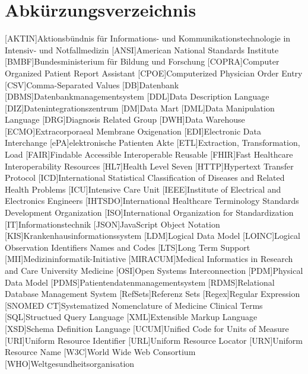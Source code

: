 \chapter*{Abkürzungsverzeichnis}

\begin{acronym}[ABK]
	[AKTIN]{Aktionsbündnis für Informations- und Kommunikationstechnologie in Intensiv- und Notfallmedizin}
	[ANSI]{American National Standards Institute}
	[BMBF]{Bundesministerium für Bildung und Forschung}
	[COPRA]{Computer Organized Patient Report Assistant}
	[CPOE]{Computerized Physician Order Entry}
	[CSV]{Comma-Separated Values}
	[DB]{Datenbank}
	[DBMS]{Datenbankmanagementsystem}
	[DDL]{Data Description Language}
	[DIZ]{Datenintegrationszentrum}
	[DM]{Data Mart}
	[DML]{Data Manipulation Language}
	[DRG]{Diagnosis Related Group}
	[DWH]{Data Warehouse}
	[ECMO]{Extracorporaeal Membrane Oxigenation}
	[EDI]{Electronic Data Interchange}
	[ePA]{elektronische Patienten Akte}
	[ETL]{Extraction, Transformation, Load}
	[FAIR]{Findable Accessible Interoperable Reusable}
	[FHIR]{Fast Healthcare Interoperability Resources}
	[HL7]{Health Level Seven}
	[HTTP]{Hypertext Transfer Protocol}
	[ICD]{International Statistical Classification of Diseases and Related Health Problems}
	[ICU]{Intensive Care Unit}
	[IEEE]{Institute of Electrical and Electronics Engineers}
	[IHTSDO]{International Healthcare Terminology Standards Development Organization}
	[ISO]{International Organization for Standardization}
	[IT]{Informationstechnik}
	[JSON]{JavaScript Object Notation}
	[KIS]{Krankenhausinformationssystem}
	[LDM]{Logical Data Model}
	[LOINC]{Logical Observation Identifiers Names and Codes}
	[LTS]{Long Term Support}
	[MII]{Medizininformatik-Initiative}
	[MIRACUM]{Medical Informatics in Research and Care University Medicine}
	[OSI]{Open Systems Interconnection}
	[PDM]{Physical Data Model}
	[PDMS]{Patientendatenmanagementsystem}
	[RDMS]{Relational Database Management System}
	[RefSets]{Referenz Sets}
	[Regex]{Regular Expression}
	[SNOMED CT]{Systematized Nomenclature of Medicine Clinical Terms}
	[SQL]{Structued Query Language}
	[XML]{Extensible Markup Language}
	[XSD]{Schema Definition Language}
	[UCUM]{Unified Code for Units of Measure}
	[URI]{Uniform Resource Identifier}
	[URL]{Uniform Resource Locator}
	[URN]{Uniform Resource Name}
	[W3C]{World Wide Web Consortium}
	[WHO]{Weltgesundheitsorganisation}

\end{acronym}

